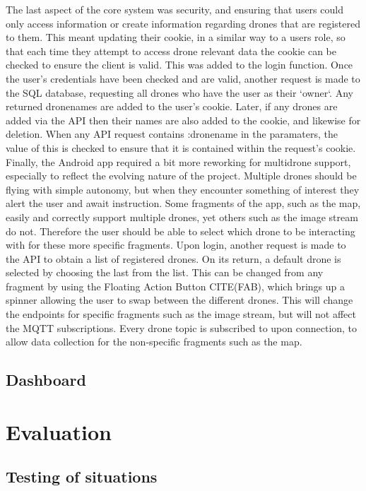 \documentclass{article}
\begin{document}
The last aspect of the core system was security, and ensuring that users could only access information or create information regarding drones that are registered to them. This meant updating their cookie, in a similar way to a users role, so that each time they attempt to access drone relevant data the cookie can be checked to ensure the client is valid. This was added to the login function. Once the user's credentials have been checked and are valid, another request is made to the SQL database, requesting all drones who have the user as their `owner`. Any returned dronenames are added to the user's cookie. Later, if any drones are added via the API then their names are also added to the cookie, and likewise for deletion. When any API request contains :dronename in the paramaters, the value of this is checked to ensure that it is contained within the request's cookie. 
Finally, the Android app required a bit more reworking for multidrone support, especially to reflect the evolving nature of the project. Multiple drones should be flying with simple autonomy, but when they encounter something of interest they alert the user and await instruction. Some fragments of the app, such as the map, easily and correctly support multiple drones, yet others such as the image stream do not. Therefore the user should be able to select which drone to be interacting with for these more specific fragments. Upon login, another request is made to the API to obtain a list of registered drones. On its return, a default drone is selected by choosing the last from the list. This can be changed from any fragment by using the Floating Action Button CITE(FAB), which brings up a spinner allowing the user to swap between the different drones. This will change the endpoints for specific fragments such as the image stream, but will not affect the MQTT subscriptions. Every drone topic is subscribed to upon connection, to allow data collection for the non-specific fragments such as the map. 


\subsection{Dashboard} \label{Dashboard}

\section{Evaluation}

\subsection{Testing of situations}
\end{document}
